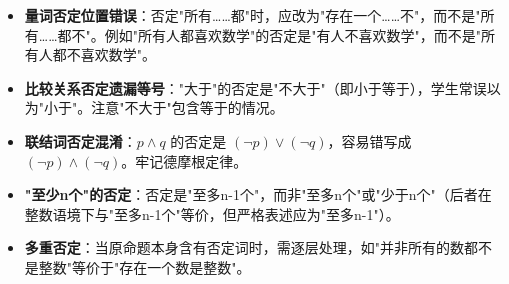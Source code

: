 \begin{trapbox}
\begin{itemize}
    \item \textbf{量词否定位置错误}：否定"所有……都"时，应改为"存在一个……不"，而不是"所有……都不"。例如"所有人都喜欢数学"的否定是"有人不喜欢数学"，而不是"所有人都不喜欢数学"。
    \item \textbf{比较关系否定遗漏等号}："大于"的否定是"不大于"（即小于等于），学生常误以为"小于"。注意"不大于"包含等于的情况。
    \item \textbf{联结词否定混淆}：$p\land q$ 的否定是 $(\lnot p)\lor(\lnot q)$，容易错写成 $(\lnot p)\land(\lnot q)$。牢记德摩根定律。
    \item \textbf{"至少n个"的否定}：否定是"至多n-1个"，而非"至多n个"或"少于n个"（后者在整数语境下与"至多n-1个"等价，但严格表述应为"至多n-1"）。
    \item \textbf{多重否定}：当原命题本身含有否定词时，需逐层处理，如"并非所有的数都不是整数"等价于"存在一个数是整数"。
\end{itemize}
\end{trapbox}